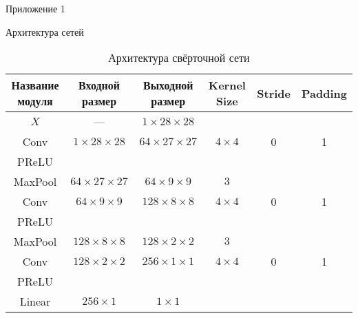 \documentclass[a4paper,12pt,titlepage,finall]{article}
\begin{document}
\begin{section}{Приложение 1}
\begin{subsection}{Архитектура сетей}
	\begin{table}[H]
		\centering
		\begin{tabular}{cccccc}
			\hline
			Название модуля & Входной размер & Выходной размер & Kernel Size & Stride & Padding \\
			\hline
			$X$ & --- & $1\times28\times28$ & & & \\
			Conv & $1\times28\times28$ & $64\times27\times27$ & $4\times4$ & 0 & 1 \\
			PReLU & & & & & \\
			MaxPool & $64\times27\times27$ & $64\times9\times9$ & $3$ & & \\
			Conv & $64\times9\times9$ & $128\times8\times8$ & $4\times4$ & 0 & 1 \\
			PReLU & & & & & \\
			MaxPool & $128\times8\times8$ & $128\times2\times2$ & $3$ & & \\
			Conv & $128\times2\times2$ & $256\times1\times1$ & $4\times4$ & 0 & 1 \\
			PReLU & & & & & \\
			Linear & $256\times1$ & $1\times1$ & & & \\	
			\hline
		\end{tabular}
		\caption{\label{tabular:6}Архитектура свёрточной сети}
	\end{table}
	
\end{subsection}
\end{section}	
\end{document}
